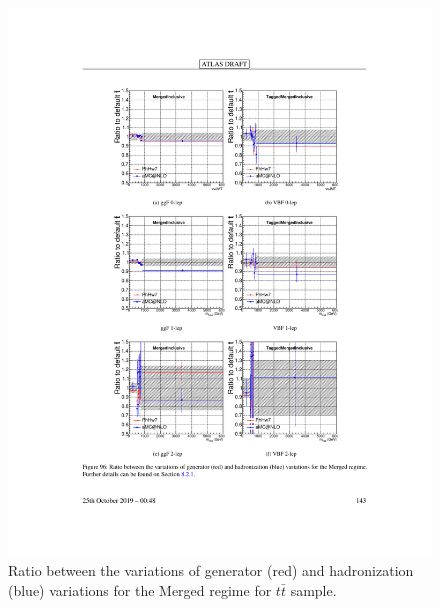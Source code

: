 \begin{figure}[h!]
  \centering
  \includegraphics[width=\hsize]{figures/Analysis/modelingsysts/ttbar_gen_had_merg.pdf}
            \caption{Ratio between the variations of generator (red) and hadronization (blue) variations for the Merged regime for $t\bar{t}$ sample.} 
  \label{fig:ttbar_gen_merg}
\end{figure} 
\FloatBarrier


